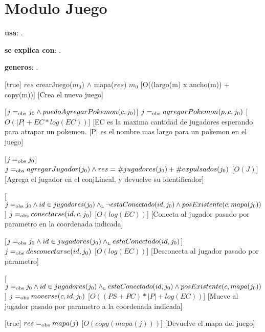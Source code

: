 \section{Modulo Juego}


\begin{Interfaz}

  \textbf{usa}: .

  \textbf{se explica con}: .

  \textbf{generos}: .

  [true]
  {$res$ \igobs crearJuego($m_0$) $\land$ mapa($res$) \igobs $m_0$}
  [O((largo(m) x ancho(m)) + copy(m))]
  [Crea el nuevo juego]

  [$j =_{\mathrm{obs}} j_0 \land puedoAgregarPokemon(c, j_0)$]
  {$j =_{\mathrm{obs}} agregarPokemon(p, c, j_0)$}
  [$O(|P| + EC * log(EC))$]
  [EC es la maxima cantidad de jugadores esperando para atrapar un pokemon. |P| es el nombre mas largo para un pokemon en el juego]

  [$j =_{\mathrm{obs}} j_0$]
  {$j =_{\mathrm{obs}} agregarJugador(j_0) \land res = \#jugadores(j_0) + \#expulsados(j_0)$}
  [$O(J)$]
  [Agrega el jugador en el conjLineal, y devuelve su identificador]
  
  [$j =_{\mathrm{obs}} j_0 \land id \in jugadores(j_0) \land_{\mathrm{\scriptscriptstyle{L}}} \neg estaConectado(id, j_0) \land posExistente(c, mapa(j_0))$]
  {$j =_{\mathrm{obs}} conectarse(id, c, j_0)$}
  [$O(log(EC))$]
  [Conecta al jugador pasado por parametro en la coordenada indicada]
  
  [$j =_{\mathrm{obs}} j_0 \land id \in jugadores(j_0) \land_{\mathrm{\scriptscriptstyle{L}}} estaConectado(id, j_0)$]
  {$j =_{\mathrm{obs}} desconectarse(id, j_0)$}
  [$O(log(EC))$]
  [Desconecta al jugador pasado por parametro]
  
  [$j =_{\mathrm{obs}} j_0 \land id \in jugadores(j_0) \land_{\mathrm{\scriptscriptstyle{L}}} estaConectado(id, j_0) \land posExistente(c, mapa(j_0))$]
  {$j =_{\mathrm{obs}} moverse(c, id, j_0)$}
  [$O((PS + PC) * |P| + log(EC))$]
  [Mueve al jugador pasado por parametro a la coordenada indicada]

  [true]
  {$res =_{\mathrm{obs}} mapa(j)$}
  [$O(copy(mapa(j)))$]
  [Devuelve el mapa del juego]


\end{Interfaz}
